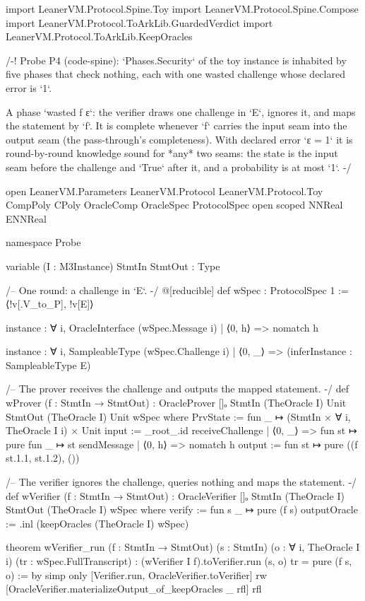 \begin{leancode}
import LeanerVM.Protocol.Spine.Toy
import LeanerVM.Protocol.Spine.Compose
import LeanerVM.Protocol.ToArkLib.GuardedVerdict
import LeanerVM.Protocol.ToArkLib.KeepOracles

/-!
Probe P4 (code-spine): `Phases.Security` of the toy instance is inhabited by five phases that
check nothing, each with one wasted challenge whose declared error is `1`.

A phase `wasted f ε`: the verifier draws one challenge in `E`, ignores it, and maps the
statement by `f`. It is complete whenever `f` carries the input seam into the output seam
(the pass-through's completeness). With declared error `ε = 1` it is round-by-round knowledge
sound for *any* two seams: the state is the input seam before the challenge and `True` after
it, and a probability is at most `1`.
-/

open LeanerVM.Parameters LeanerVM.Protocol LeanerVM.Protocol.Toy CompPoly CPoly OracleComp
  OracleSpec ProtocolSpec
open scoped NNReal ENNReal

namespace Probe

variable (I : M3Instance) {StmtIn StmtOut : Type}

/-- One round: a challenge in `E`. -/
@[reducible]
def wSpec : ProtocolSpec 1 := ⟨!v[.V_to_P], !v[E]⟩

instance : ∀ i, OracleInterface (wSpec.Message i)
  | ⟨0, h⟩ => nomatch h

instance : ∀ i, SampleableType (wSpec.Challenge i)
  | ⟨0, _⟩ => (inferInstance : SampleableType E)

/-- The prover receives the challenge and outputs the mapped statement. -/
def wProver (f : StmtIn → StmtOut) :
    OracleProver []ₒ StmtIn (TheOracle I) Unit StmtOut (TheOracle I) Unit wSpec where
  PrvState := fun _ ↦ (StmtIn × ∀ i, TheOracle I i) × Unit
  input := _root_.id
  receiveChallenge
    | ⟨0, _⟩ => fun st ↦ pure fun _ ↦ st
  sendMessage
    | ⟨0, h⟩ => nomatch h
  output := fun st ↦ pure ((f st.1.1, st.1.2), ())

/-- The verifier ignores the challenge, queries nothing and maps the statement. -/
def wVerifier (f : StmtIn → StmtOut) :
    OracleVerifier []ₒ StmtIn (TheOracle I) StmtOut (TheOracle I) wSpec where
  verify := fun s _ ↦ pure (f s)
  outputOracle := .inl (keepOracles (TheOracle I) wSpec)

theorem wVerifier_run (f : StmtIn → StmtOut) (s : StmtIn) (o : ∀ i, TheOracle I i)
    (tr : wSpec.FullTranscript) :
    (wVerifier I f).toVerifier.run (s, o) tr = pure (f s, o) := by
  simp only [Verifier.run, OracleVerifier.toVerifier]
  rw [OracleVerifier.materializeOutput_of_keepOracles _ rfl]
  rfl


\end{leancode}
